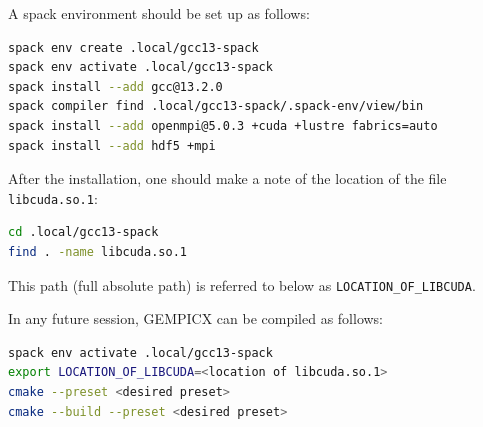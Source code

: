 \documentclass[11pt]{article}
\begin{document}
A spack environment should be set up as follows:
\begin{lstlisting}[language=bash]
spack env create .local/gcc13-spack
spack env activate .local/gcc13-spack
spack install --add gcc@13.2.0
spack compiler find .local/gcc13-spack/.spack-env/view/bin
spack install --add openmpi@5.0.3 +cuda +lustre fabrics=auto
spack install --add hdf5 +mpi
\end{lstlisting}

After the installation, one should make a note of the location of the
file \texttt{libcuda.so.1}:
\begin{lstlisting}[language=bash]
cd .local/gcc13-spack
find . -name libcuda.so.1
\end{lstlisting}
This path (full absolute path) is referred to below as
\texttt{LOCATION\_OF\_LIBCUDA}.

In any future session, GEMPICX can be compiled as follows:
\begin{lstlisting}[language=bash]
spack env activate .local/gcc13-spack
export LOCATION_OF_LIBCUDA=<location of libcuda.so.1>
cmake --preset <desired preset>
cmake --build --preset <desired preset>
\end{lstlisting}
\end{document}
